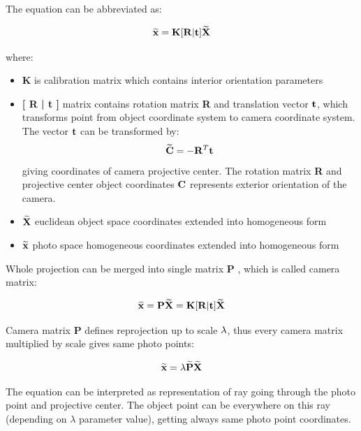 \documentclass[a4paper,12pt]{article}
\newcommand{\ematr}[1]{
{\bf #1}
}
\newcommand{\evect}[1]{
{\bf #1}
}
\newcommand{\ehvect}[1]{
{\bf \widetilde{#1}}
}
\newcommand{\escal}[1]{
{\it #1}
}
\begin{document}
The equation can be abbreviated as:

\begin{equation}
\label{eq:p_exp}
\ehvect{x} = \ematr{K} \ematr{[}\ematr{R}|\evect{t}\ematr{]} \ehvect{X}
\end{equation}

where:

\begin{itemize}
\item \ematr{K} is calibration matrix which contains interior orientation parameters
\item \ematr{[\ematr{R}|\evect{t}]} matrix contains rotation matrix\ematr{R} and translation vector $\evect{t}$, 
	      which transforms point from object coordinate system 
	      to camera coordinate system. 
	      The vector $\evect{t}$ can  be transformed by:
	      \begin{equation}
	      \ehvect{C} = - \ematr{R}^{T}\evect{t}
	      \end{equation}
	      giving coordinates of camera projective center. The rotation matrix \ematr{R} and projective 
	      center object coordinates $\evect{C}$
	      represents exterior orientation of the camera.   
\item $\ehvect{X}$ euclidean object space coordinates extended into homogeneous form
\item $\ehvect{x}$ photo space homogeneous coordinates extended into homogeneous form
\end{itemize}

Whole projection can be merged into single matrix \ematr{P}, which is called camera matrix:

\begin{equation}
\label{eq:p_abbr}
\ehvect{x} =  \ematr{P} \ehvect{X} = \ematr{K} \ematr{[}\ematr{R}|\evect{t}\ematr{]} \ehvect{X}
\end{equation}

Camera matrix \ematr{P} defines reprojection up to scale $\escal{\lambda}$, thus every camera matrix multiplied by scale gives same photo points:

\begin{equation}
\ehvect{x}=\lambda\ehvect{P}\ehvect{X}
 \end{equation}

The equation can be interpreted as representation of ray going through the photo point and projective center. 
The object point can be everywhere on this ray (depending on $\lambda$ parameter value), getting always 
same photo point coordinates.
\end{document}
